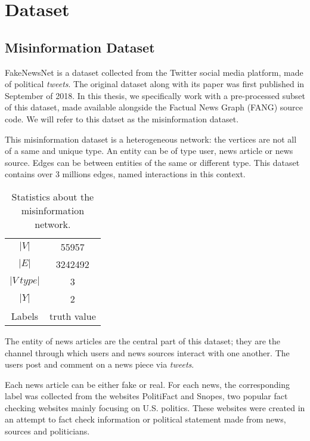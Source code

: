 
\chapter{Dataset} %
\label{cha:Dataset}

\section{Misinformation Dataset}

FakeNewsNet is a dataset collected from the Twitter social media platform, made of political \textit{tweets}.
The original dataset along with its paper was first published in September of 2018.
In this thesis, we specifically work with a pre-processed subset of this dataset, made available alongside the Factual News Graph (FANG) source code. We will refer to this datset as the misinformation dataset.

This misinformation dataset is a heterogeneous network: the vertices are not all of a same and unique type.
An entity can be of type user, news article or news source.
Edges can be between entities of the same or different type.
This dataset contains over 3 millions edges, named interactions in this context.

\begin{table}[h]
    \centering
    \caption{Statistics about the misinformation network.}
    \label{tab:dataset:network}
    \begin{tabular}{cc}
        \toprule
        $|V|$ & 55957\\
        $|E|$ & 3242492\\
        $|V\ type|$ & 3\\
        $|Y|$ & 2\\
        Labels & truth value\\
        \bottomrule
    \end{tabular}
\end{table}

The entity of news articles are the central part of this dataset; they are the channel through which users and news sources interact with one another. The users post and comment on a news piece via \textit{tweets}.

Each news article can be either fake or real. 
For each news, the corresponding label was collected from the websites PolitiFact and Snopes, two popular fact checking websites mainly focusing on U.S. politics.
These websites were created in an attempt to fact check information or political statement made from news, sources and politicians.

